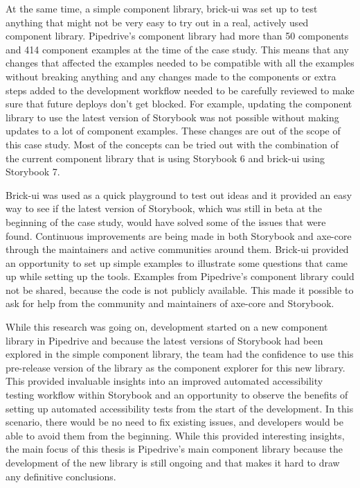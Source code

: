 \documentclass{master_thesis}
\begin{document}
At the same time, a simple component library, brick-ui was set up to test anything that might not be very easy to try out in a real, actively used component library. Pipedrive's component library had more than 50 components and 414 component examples at the time of the case study. This means that any changes that affected the examples needed to be compatible with all the examples without breaking anything and any changes made to the components or extra steps added to the development workflow needed to be carefully reviewed to make sure that future deploys don't get blocked. For example, updating the component library to use the latest version of Storybook was not possible without making updates to a lot of component examples. These changes are out of the scope of this case study. Most of the concepts can be tried out with the combination of the current component library that is using Storybook 6 and brick-ui using Storybook 7.

Brick-ui was used as a quick playground to test out ideas and it provided an easy way to see if the latest version of Storybook, which was still in beta at the beginning of the case study, would have solved some of the issues that were found. Continuous improvements are being made in both  Storybook and axe-core through the maintainers and active communities around them. Brick-ui provided an opportunity to set up simple examples to illustrate some questions that came up while setting up the tools. Examples from Pipedrive's component library could not be shared, because the code is not publicly available. This made it possible to ask for help from the community and maintainers of axe-core and Storybook.

While this research was going on, development started on a new component library in Pipedrive and because the latest versions of Storybook had been explored in the simple component library, the team had the confidence to use this pre-release version of the library as the component explorer for this new library. This provided invaluable insights into an improved automated accessibility testing workflow within Storybook and an opportunity to observe the benefits of setting up automated accessibility tests from the start of the development. In this scenario, there would be no need to fix existing issues, and developers would be able to avoid them from the beginning. While this provided interesting insights, the main focus of this thesis is Pipedrive's main component library because the development of the new library is still ongoing and that makes it hard to draw any definitive conclusions.
\end{document}
